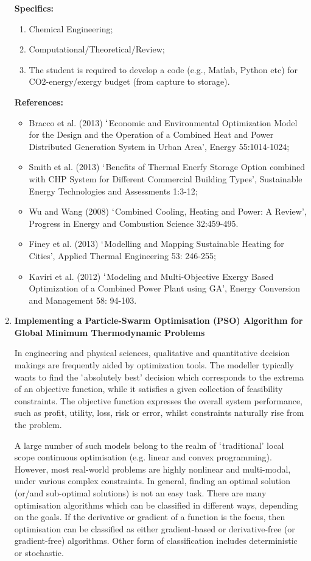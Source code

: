 \documentclass[12pts,a4paper,amsmath,amssymb,floatfix]{article}%
\begin{document}
\begin{enumerate}[label=\bfseries Project \arabic*:]
\noindent
{\bf Specifics:} 
\begin{enumerate}
\item Chemical Engineering;
\item Computational/Theoretical/Review;
\item The student is required to develop a code (e.g., Matlab, Python etc) for CO2-energy/exergy budget (from capture to storage).
\end{enumerate} 

\noindent
{\bf References:}
\begin{itemize}
\item Bracco et al. (2013) $\lq$Economic and Environmental Optimization Model for the Design and the Operation of a Combined Heat and Power Distributed Generation System in Urban Area’, Energy 55:1014-1024;
\item Smith et al. (2013) $\lq$Benefits of Thermal Enerfy Storage Option combined with CHP System for Different Commercial Building Types’, Sustainable Energy Technologies and Assessments 1:3-12;
\item Wu and Wang (2008) $\lq$Combined Cooling, Heating and Power: A Review’, Progress in Energy and Combustion Science 32:459-495.
\item Finey et al. (2013) $\lq$Modelling and Mapping Sustainable Heating for Cities’, Applied Thermal Engineering 53: 246-255;
\item Kaviri et al. (2012) $\lq$Modeling and Multi-Objective Exergy Based Optimization of a Combined Power Plant using GA’, Energy Conversion and Management 58: 94-103.
\end{itemize}

\clearpage

\item {\bf Implementing a Particle-Swarm Optimisation (PSO) Algorithm for Global Minimum Thermodynamic Problems} 

In engineering and physical sciences, qualitative and quantitative decision makings are frequently aided by optimization tools. The modeller typically wants to find the $\lq$absolutely best’ decision which corresponds to the extrema of an objective function, while it satisfies a given collection of feasibility constraints. The objective function expresses the overall system performance, such as profit, utility, loss, risk or error, whilst constraints naturally rise from the problem.

A large number of such models belong to the realm of $\lq$traditional' local scope continuous optimisation (e.g. linear and convex programming). However, most real-world problems are highly nonlinear and multi-modal, under various complex constraints. In general, finding an optimal solution (or/and sub-optimal solutions) is not an easy task. There are many optimisation algorithms which can be classified in different ways, depending on the goals. If the derivative or gradient of a function is the focus, then optimisation can be classified as either gradient-based or derivative-free (or gradient-free) algorithms. Other form of classification includes deterministic or stochastic.


\end{enumerate}
\end{document}

